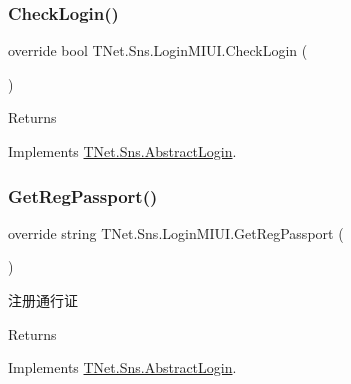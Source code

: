 \subsubsection{\texorpdfstring{Check\+Login()}{CheckLogin()}}
{\footnotesize\ttfamily override bool T\+Net.\+Sns.\+Login\+M\+I\+U\+I.\+Check\+Login (\begin{DoxyParamCaption}{ }\end{DoxyParamCaption})\hspace{0.3cm}{\ttfamily [virtual]}}





\begin{DoxyReturn}{Returns}

\end{DoxyReturn}


Implements \mbox{\hyperlink{class_t_net_1_1_sns_1_1_abstract_login_a6b5dac3d6d46efb7b1e4049e674105e5}{T\+Net.\+Sns.\+Abstract\+Login}}.

\mbox{\label{class_t_net_1_1_sns_1_1_login_m_i_u_i_a600a638293acdeb2e299f047b7f339f5}} 
\subsubsection{\texorpdfstring{Get\+Reg\+Passport()}{GetRegPassport()}}
{\footnotesize\ttfamily override string T\+Net.\+Sns.\+Login\+M\+I\+U\+I.\+Get\+Reg\+Passport (\begin{DoxyParamCaption}{ }\end{DoxyParamCaption})\hspace{0.3cm}{\ttfamily [virtual]}}



注册通行证 

\begin{DoxyReturn}{Returns}

\end{DoxyReturn}


Implements \mbox{\hyperlink{class_t_net_1_1_sns_1_1_abstract_login_a3930eb564bb4804e1b646d749f20907a}{T\+Net.\+Sns.\+Abstract\+Login}}.

\mbox{\label{class_t_net_1_1_sns_1_1_login_m_i_u_i_a17398cc72d275ef6ea9c866cc25c77d3}} 
